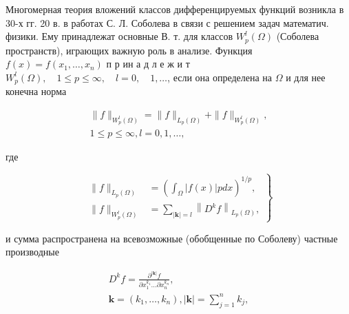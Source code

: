 \documentclass[10pt]{article}
\begin{document}
Многомерная теория вложений классов дифференцируемых функций возникла в 30-х гг. 20 в. в работах С. Л. Соболева в связи с решением задач математич. физики. Ему принадлежат основные В. т. для классов $W_{p}^{l}(\Omega)$ (Соболева пространств), играющих важную роль в анализе. Функция $f(x)=f\left(x_{1}, \ldots, x_{n}\right)$ п р ин а д л е ж и т $W_{p}^{l}(\Omega), \quad 1 \leqslant p \leqslant \infty, \quad l=0, \quad 1, \ldots$, если она определена на $\Omega$ и для нее конечна норма



\[

\begin{gathered}

\|f\|_{W_{p}^{l}(\Omega)}=\|f\|_{L_{p}(\Omega)}+\|f\|_{W_{p}^{l}(\Omega)}, \\

1 \leqslant p \leqslant \infty, l=0,1, \ldots,

\end{gathered}

\]



где



\[

\left.\begin{array}{rl}

\|f\|_{L_{p}(\Omega)} & =\left(\int_{\Omega}|f(x)| p d x\right)^{1 / p}, \\

\|f\|_{W_{p}^{l}(\Omega)} & =\sum_{|\boldsymbol{k}|=l}\left\|D^{k} f\right\|_{L_{p}(\Omega)},

\end{array}\right\}

\]



и сумма распространена на всевозможные (обобщенные по Соболеву) частные производные



\[

\begin{gathered}

D^{k} f=\frac{\partial^{|\boldsymbol{k}|} f}{\partial x_{1}^{k_{1}} \ldots \partial x_{n}^{k_{n}}}, \\

\boldsymbol{k}=\left(k_{1}, \ldots, k_{n}\right),|\boldsymbol{k}|=\sum_{j=1}^{n} k_{j},

\end{gathered}

\]
\end{document}
